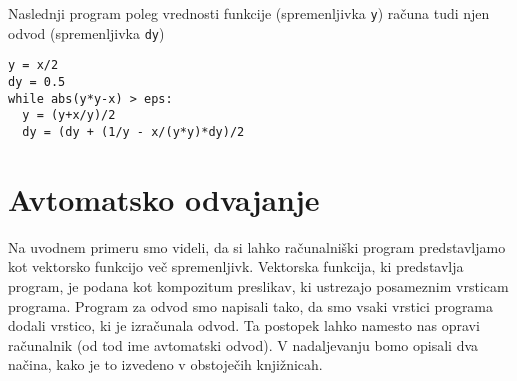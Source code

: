 \documentclass{article}
\begin{document}
Naslednji program poleg vrednosti funkcije (spremenljivka \texttt{y}) računa
tudi njen odvod (spremenljivka \texttt{dy})
\begin{verbatim}
y = x/2
dy = 0.5
while abs(y*y-x) > eps:
  y = (y+x/y)/2
  dy = (dy + (1/y - x/(y*y)*dy)/2
\end{verbatim}

\section{Avtomatsko odvajanje}
Na uvodnem primeru smo videli, da si lahko računalniški program predstavljamo
kot vektorsko funkcijo več spremenljivk. Vektorska funkcija, ki predstavlja
program, je podana kot kompozitum preslikav, ki ustrezajo posameznim vrsticam
programa. Program za odvod smo napisali tako, da smo vsaki vrstici
programa dodali vrstico, ki je izračunala odvod. Ta postopek lahko namesto nas
opravi računalnik (od tod ime avtomatski odvod). V nadaljevanju bomo opisali dva
načina, kako je to izvedeno v obstoječih knjižnicah. 
\end{document}
